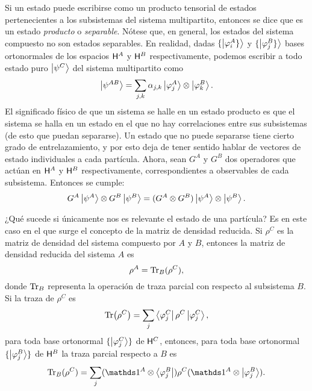 Si un estado puede escribirse como un producto tensorial de estados pertenecientes a los subsistemas del sistema multipartito, entonces se dice que es un estado \textit{producto} o \textit{separable}. Nótese que, en general, los estados del sistema compuesto no son estados separables. En realidad, dadas $\{\ket{\varphi_{i}^{A}\}}$ y $\{\ket{\varphi_{j}^{B}\}}$ bases ortonormales de los espacios ${\sf H}^{A}$ y ${\sf H}^{B}$ respectivamente, podemos escribir a todo estado puro $\ket{\psi^{C}}$ del sistema multipartito como
\begin{equation}
    \ket{\psi^{AB}}=\sum_{j,k}\alpha_{j,k}\ket{\varphi_{j}^{A}}\otimes\ket{\varphi_{k}^{B}}.\nonumber
\end{equation}
El significado físico de que un sistema se halle en un estado producto es que el sistema se halla en un estado en el que no hay correlaciones entre sus subsistemas (de esto que puedan separarse). Un estado que no puede separarse tiene cierto grado de entrelazamiento, y por esto deja de tener sentido hablar de vectores de estado individuales a cada partícula. Ahora, sean $G^{A}$ y $G^{B}$ dos operadores que actúan en ${\sf H}^{A}$ y ${\sf H}^{B}$ respectivamente, correspondientes a observables de cada subsistema. Entonces se cumple:
\begin{equation}
    G^{A}\ket{\psi^{A}}\otimes G^{B}\ket{\psi^{B}}=(G^{A}\otimes G^{B})\ket{\psi^{A}}\otimes\ket{\psi^{B}}.\nonumber
\end{equation}


¿Qué sucede si únicamente nos es relevante el estado de una partícula? Es en este caso en el que surge el concepto de la matriz de densidad reducida. Si $\rho^{C}$ es la matriz de densidad del sistema compuesto por $A$ y $B$, entonces la matriz de densidad reducida del sistema $A$ es
\begin{equation}
    \rho^{A}=\Tr_{B}(\rho^{C}),\nonumber
\end{equation}
donde $\Tr_{B}$ representa la operación de traza parcial con respecto al subsistema $B$. Si la traza de $\rho^{C}$ es 
\begin{equation}
    \Tr(\rho^{C})=\sum_{j}\bra{\varphi^{C}_{j}}\rho^{C}\ket{\varphi^{C}_{j}},\nonumber
\end{equation}
para toda base ortonormal $\{\ket{\varphi^{C}_{j}}\}$ de ${\sf H}^{C}$, entonces, para toda base ortonormal $\{\ket{\varphi^{B}_{j}}\}$ de ${\sf H}^{B}$  la traza parcial respecto a $B$ es \cite{Hardy}
\begin{equation}\label{eq:Ch1PartialTrace}
    \Tr_{B}(\rho^{C})=\sum_{j}(\Id^{A}\otimes \bra{\varphi^{B}_{j}})\rho^{C}(\Id^{A}\otimes \ket{\varphi^{B}_{j}}).
\end{equation}

